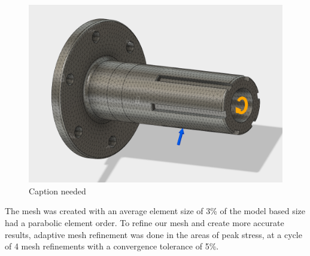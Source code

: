 \documentclass{report}
\begin{document}
    \begin{figure}[H]
        \centering
        \includegraphics[width=\linewidth]{images/fig15}
        \caption{Caption needed}
    \end{figure}
    The mesh was created with an average element size of 3\% of the model based size had a parabolic element order. To refine our mesh and create more accurate results, adaptive mesh refinement was done in the areas of peak stress, at a cycle of 4 mesh refinements with a convergence tolerance of 5\%. 
    
\end{document}
